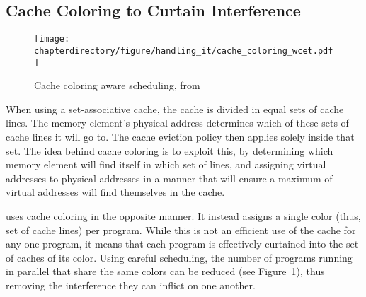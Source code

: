 \stopallthesefloats
\subsection{Cache Coloring to Curtain Interference}
\begin{figure}[hbt]
\begin{center}
\texttt{[image: \\chapterdirectory/figure/handling\_it/cache\_coloring\_wcet.pdf]}
\end{center}
\caption{Cache coloring aware scheduling, from \cite{DBLP:journals/corr/abs-1903-09310}}%
\label{fig:handling_it:cache_coloring}
\end{figure}
When using a set-associative cache, the cache is divided in equal sets of cache
lines. The memory element's physical address determines which of these sets of
cache lines it will go to. The cache eviction policy then applies solely inside
that set. The idea behind cache coloring is to exploit this, by determining
which memory element will find itself in which set of lines, and assigning
virtual addresses to physical addresses in a manner that will ensure a maximum
of virtual addresses will find themselves in the cache.

\cite{DBLP:journals/corr/abs-1903-09310} uses cache coloring in the opposite
manner. It instead assigns a single color (thus, set of cache lines) per
program. While this is not an efficient use of the cache for any one program,
it means that each program is effectively curtained into the set of caches of
its color. Using careful scheduling, the number of programs running in parallel
that share the same colors can be reduced (see
Figure~\ref{fig:handling_it:cache_coloring}), thus removing the interference
they can inflict on one another.
\stopallthesefloats
